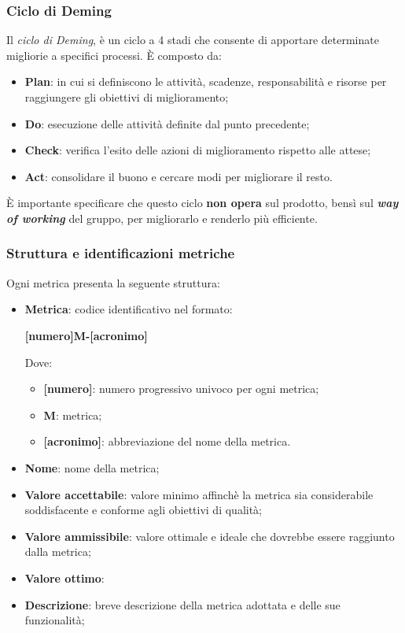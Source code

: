 \subsubsection{Ciclo di Deming}
Il \textit{ciclo di Deming}, è un ciclo a 4 stadi che consente di apportare determinate migliorie a specifici processi. È composto da:
\begin{itemize}
	\item \textbf{Plan}: in cui si definiscono le attività, scadenze, responsabilità e risorse per raggiungere gli obiettivi di miglioramento;
	\item \textbf{Do}: esecuzione delle attività definite dal punto precedente;
	\item \textbf{Check}: verifica l'esito delle azioni di miglioramento rispetto alle attese;
	\item \textbf{Act}: consolidare il buono e cercare modi per migliorare il resto.
\end{itemize}

È importante specificare che questo ciclo \textbf{non opera} sul prodotto, bensì sul \textbf{\textit{way of working}} del gruppo, per migliorarlo e renderlo più efficiente.

\subsubsection{Struttura e identificazioni metriche}
Ogni metrica presenta la seguente struttura:
\begin{itemize}
	\item \textbf{Metrica}:
	      codice identificativo nel formato:
	      \begin{center}
		      \textbf{[numero]M-[acronimo]}
	      \end{center}
	      Dove:
	      \begin{itemize}
		      \item \textbf{[numero]}: numero progressivo univoco per ogni metrica;
		      \item \textbf{M}: metrica;
		      \item \textbf{[acronimo]}: abbreviazione del nome della metrica.
	      \end{itemize}
	\item \textbf{Nome}: nome della metrica;
	\item \textbf{Valore accettabile}: valore minimo affinchè la metrica sia considerabile soddisfacente e conforme agli obiettivi di qualità;
	\item \textbf{Valore ammissibile}: valore ottimale e ideale che dovrebbe essere raggiunto dalla metrica;
	\item \textbf{Valore ottimo}:
	\item \textbf{Descrizione}: breve descrizione della metrica adottata e delle sue funzionalità;
\end{itemize}

